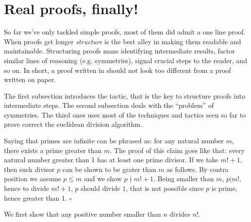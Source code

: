 
\section{Real proofs, finally!}\label{sec:realproofs}

So far we've only tackled simple proofs, most of them did admit a one line
proof.  When proofs get longer \emph{structure} is the best alley in making
them readable and maintainable.  Structuring proofs mans identifying
intermediate results, factor similar lines of reasoning (e.g. symmetries),
signal crucial steps to the reader, and so on.  In short, a
proof written in \Coq{} should not look too different from a proof
written on paper.

The first subsection introduces the  tactic, that is the key
to structure proofs into intermediate steps.  The second subsection
deals with the ``problem'' of symmetries.  The third ones uses most
of the techniques and tactics seen so far to prove correct the
euclidean division algorithm.

\label{sec:infprimes}

Saying that primes are infinite can be phrased as: for any natural number
$m$, there exists a prime greater than $m$.  The proof of this claim goes like
that: every natural number greater than 1 has at least one prime divisor.  If
we take $m! + 1$, then such divisor $p$ can be shown to be grater than $m$ as
follows.  By contra position we assume $p \leq m$ and we show $p \nmid m!+1$.
Being smaller than $m$, $p | m!$, hence to divide $m!+1$, $p$ should divide
$1$, that is not possible since $p$ is prime, hence greater than 1.
\hfill$\square$

We first show that any positive number smaller than $n$ divides $n!$.

